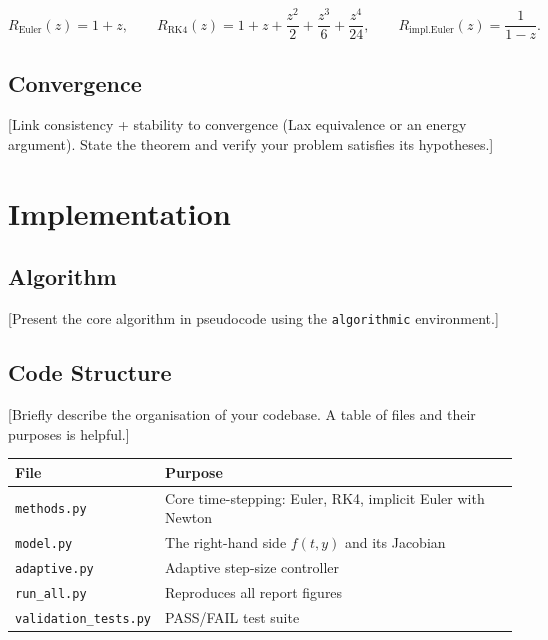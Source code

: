 \documentclass[11pt,a4paper]{article}
\theoremstyle{definition}
\theoremstyle{remark}
\begin{document}
\begin{equation}
    R_{\text{Euler}}(z) = 1 + z, \qquad
    R_{\text{RK4}}(z) = 1 + z + \frac{z^2}{2} + \frac{z^3}{6} + \frac{z^4}{24},
    \qquad
    R_{\text{impl.Euler}}(z) = \frac{1}{1 - z}.
\end{equation}

\subsection{Convergence}
[Link consistency + stability to convergence (Lax equivalence or an energy
argument). State the theorem and verify your problem satisfies its hypotheses.]

\newpage
\section{Implementation}

\subsection{Algorithm}
[Present the core algorithm in pseudocode using the \texttt{algorithmic}
environment.]

\begin{algorithm}[H]
\caption{[Your method name]}
\label{alg:main}
\begin{algorithmic}[1]
\State [Step 1]
    \If{[condition]}
        \State [Action]
    \EndIf
\EndFor
\State \Return [result]
\end{algorithmic}
\end{algorithm}

\subsection{Code Structure}
[Briefly describe the organisation of your codebase. A table of files and their
purposes is helpful.]

\begin{table}[H]
\centering
\begin{tabular}{ll}
\toprule
\textbf{File} & \textbf{Purpose} \\
\midrule
\texttt{methods.py} & Core time-stepping: Euler, RK4, implicit Euler with Newton \\
\texttt{model.py} & The right-hand side $f(t,y)$ and its Jacobian \\
\texttt{adaptive.py} & Adaptive step-size controller \\
\texttt{run\_all.py} & Reproduces all report figures \\
\texttt{validation\_tests.py} & PASS/FAIL test suite \\
\bottomrule
\end{tabular}
\end{table}
\end{document}
